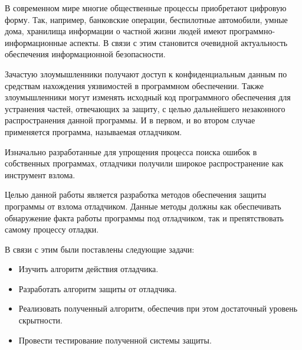 
В современном мире многие  общественные процессы приобретают цифровую форму.
Так, например, банковские операции, беспилотные автомобили, умные дома,
хранилища информации о частной жизни людей имеют программно-информационные
аспекты. В связи с этим становится очевидной актуальность обеспечения
информационной безопасности. 

Зачастую злоумышленники получают доступ к конфиденциальным данным по средствам
нахождения уязвимостей в программном обеспечении. Также злоумышленники могут
изменять исходный код программного обеспечения для устранения частей, отвечающих
за защиту, с целью дальнейшего незаконного распространения данной программы. И в
первом, и во втором случае применяется программа, называемая отладчиком. 

Изначально разработанные для упрощения процесса поиска ошибок в собственных
программах, отладчики получили широкое распространение как инструмент взлома. 

Целью данной работы является разработка методов обеспечения защиты программы от
взлома отладчиком. Данные методы должны как обеспечивать обнаружение факта работы
программы под отладчиком, так и препятствовать самому процессу отладки.

В связи с этим были поставлены следующие задачи:
\begin{itemize}
  \item Изучить алгоритм действия отладчика.
  \item Разработать алгоритм защиты от отладчика.
  \item Реализовать полученный алгоритм, обеспечив при этом достаточный
    уровень скрытности.
  \item Провести тестирование полученной системы защиты.
\end{itemize}
